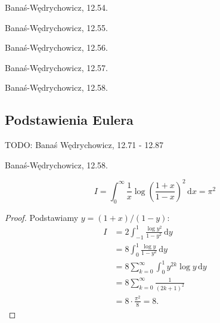 \begin{integral}
    Banaś-Wędrychowicz, 12.54.
\end{integral}

\begin{integral}
    Banaś-Wędrychowicz, 12.55.
\end{integral}

\begin{integral}
    Banaś-Wędrychowicz, 12.56.
\end{integral}

\begin{integral}
    Banaś-Wędrychowicz, 12.57.
\end{integral}

\begin{integral}
    Banaś-Wędrychowicz, 12.58.
\end{integral}

\subsection{Podstawienia Eulera}

TODO: Banaś Wędrychowicz, 12.71 - 12.87

\begin{integral}
    Banaś-Wędrychowicz, 12.58.
\end{integral}

\begin{integral}
    \begin{equation}
        I = \int_0^\infty \frac{1}{x} \log \left(\frac{1+x}{1-x}\right)^2 \,\mathrm{d}x = \pi^2
    \end{equation}
\end{integral}

\begin{proof}
    Podstawiamy $y = (1+x) / (1-y)$:
    \begin{align}
        I & = 2 \int_{-1}^1 \frac{\log y^2}{1-y^2} \,\mathrm{d}y \\
          & = 8 \int_0^1 \frac{\log y}{1-y^2} \, \mathrm{d}{y} \\
          & = 8 \sum_{k=0}^\infty \int_0^1 y^{2k} \log y \,\mathrm{d} y \\
          & = 8 \sum_{k=0}^\infty \frac{1}{(2k+1)^2} \\
          & = 8 \cdot \frac{\pi^2}{8} = 8.
    \end{align}
\end{proof}